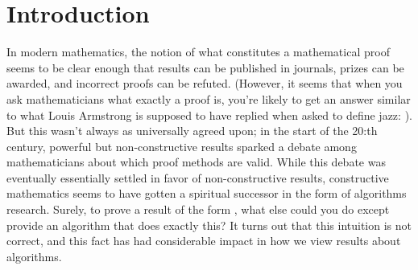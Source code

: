 
\usepackage[T1]{fontenc}
\usepackage{multicol}
\usepackage{thmtools}
\usepackage{fancyhdr}
\usepackage{mdframed}
\pagestyle{plain}
\newsavebox{\myheadbox}
\fancyhf{}

\cfoot{\thepage}
\date{}
\usepackage{csquotes}



\thispagestyle{fancy}
\theoremstyle{normalhead}
\newtheorem{theorem}{Theorem}
\newtheorem{definition}{Definition}

\section{Introduction}
In modern mathematics, the notion of what constitutes a mathematical proof seems to be clear enough that results can be published in journals, prizes can be awarded, and incorrect proofs can be refuted. (However, it seems that when you ask mathematicians what exactly a proof is, you're likely to get an answer similar to what Louis Armstrong is supposed to have replied when asked to define jazz: ). But this wasn't always as universally agreed upon; in the start of the 20:th century, powerful but non-constructive results sparked a debate among mathematicians about which proof methods are valid. While this debate was eventually essentially settled in favor of non-constructive results, constructive mathematics seems to have gotten a spiritual successor in the form of algorithms research. Surely, to prove a result of the form , what else could you do except provide an algorithm that does exactly this? It turns out that this intuition is not correct, and this fact has had considerable impact in how we view results about algorithms.

